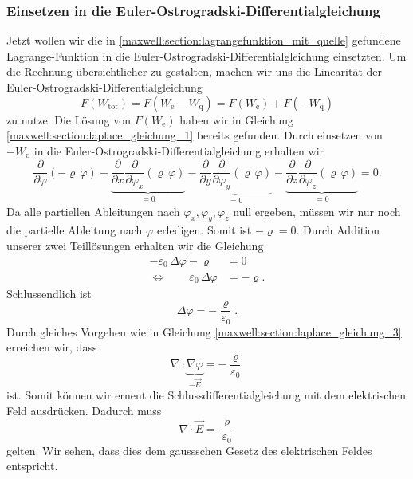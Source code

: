 \subsubsection{Einsetzen in die Euler-Ostrogradski-Differentialgleichung}
Jetzt wollen wir die in \eqref{maxwell:section:lagrangefunktion_mit_quelle} gefundene Lagrange-Funktion in die Euler-Ostrogradski-Differentialgleichung einsetzten.
Um die Rechnung übersichtlicher zu gestalten, machen wir uns die Linearität der Euler-Ostrogradski-Differentialgleichung
\begin{equation}
F(W_{\text{tot}})
=
F(W_{\text{e}} - W_{\text{q}})
=
F(W_{\text{e}}) + F(-W_{\text{q}})
\label{maxwell:section:linearität_von_DGL}
\end{equation}
zu nutze.
Die Lösung von $F(W_{\text{e}})$ haben wir in Gleichung \eqref{maxwell:section:laplace_gleichung_1} bereits gefunden.
Durch einsetzen von $-W_{\text{q}}$ in die Euler-Ostrogradski-Differentialgleichung erhalten wir
\[
\frac{\partial}{\partial\varphi}\left(-\varrho\,\varphi\right) - \underbrace{\frac{\partial}{\partial x}\frac{\partial}{\partial\varphi_x}\left(\varrho\,\varphi\right)}_{=0} - \underbrace{\frac{\partial}{\partial y}\frac{\partial}{\partial\varphi_y}\left(\varrho\,\varphi\right)}_{=0} - \underbrace{\frac{\partial}{\partial z}\frac{\partial}{\partial\varphi_z}\left(\varrho\,\varphi\right)}_{=0}
=
0.
\]
Da alle partiellen Ableitungen nach $\varphi_x, \varphi_y, \varphi_z$ null ergeben, müssen wir nur noch die partielle Ableitung nach $\varphi$ erledigen.
Somit ist
\(
-\varrho
=
0.
\)
Durch Addition unserer zwei Teillösungen erhalten wir die Gleichung
\begin{align*}
-\varepsilon_0\,\Delta\varphi - \varrho
&=
0
\\
\Leftrightarrow \qquad \varepsilon_0\,\Delta\varphi
&=
-\varrho.
\end{align*}
Schlussendlich ist
\begin{equation}
\Delta\varphi
=
-\frac{\varrho}{\varepsilon_0}.
\label{maxwell:section:erste_maxwellgleichung_1}
\end{equation}
Durch gleiches Vorgehen wie in Gleichung \eqref{maxwell:section:laplace_gleichung_3} erreichen wir, dass
\[
\nabla\cdot\underbrace{\nabla\varphi}_{\displaystyle-\vec{E}}
=
-\frac{\varrho}{\varepsilon_0}
\]
ist.
Somit können wir erneut die Schlussdifferentialgleichung mit dem elektrischen Feld ausdrücken.
Dadurch muss
\begin{equation}
\nabla\cdot\vec{E}
=
\frac{\varrho}{\varepsilon_0}
\label{maxwell:section:erste_maxwellgleichung_2}
\end{equation}
gelten.
Wir sehen, dass dies dem gaussschen Gesetz des elektrischen Feldes entspricht.


